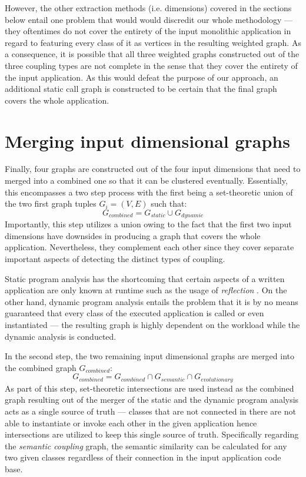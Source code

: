 \documentclass[12pt,a4paper]{report}
\begin{document}
However, the other extraction methods (i.e. dimensions) covered in the
sections below entail one problem that would would discredit
our whole methodology --- they oftentimes do not cover the entirety of the
input monolithic application in regard to featuring every class of it
as vertices in the resulting weighted graph.
As a consequence, it is possible that all three weighted graphs constructed
out of the three coupling types are not complete in the sense that they cover
the entirety of the input application. As this would defeat the purpose of
our approach, an additional static call graph is constructed to be certain
that the final graph covers the whole application.



\section{Merging input dimensional graphs} \label{sect:merging-graphs}

Finally, four graphs are constructed out of the four input dimensions
that need to merged into a combined one so that it can be clustered eventually.
Essentially, this encompasses a two step process with the first being
a set-theoretic union of the two first graph tuples \(G_i = (V, E)\) such that:
\[
  G_{combined} = G_{static} \cup G_{dynamic}
\]
Importantly, this step utilizes a union owing to the fact
that the first two input dimensions have downsides in producing a graph
that covers the whole application.
Nevertheless, they complement each other since they cover separate important
aspects of detecting the distinct types of coupling.

Static program analysis has the shortcoming that certain aspects of a written
application are only known at runtime such as the usage of
\textit{reflection} \cite{landman2017reflection}.
On the other hand, dynamic program analysis entails the problem that
it is by no means guaranteed that every class of the executed application
is called or even instantiated --- the resulting graph is highly dependent
on the workload while the dynamic analysis is conducted.

In the second step, the two remaining input dimensional graphs are merged into
the combined graph \(G_{combined}\):
\[
  G_{combined} = G_{combined} \cap G_{semantic} \cap G_{evolutionary}
\]
As part of this step, set-theoretic intersections are used instead as the
combined graph resulting out of the merger of the static and the dynamic
program analysis acts as a single source of truth --- classes that are not
connected in there are not able to instantiate or invoke each other in the
given application hence intersections are utilized to keep this single source
of truth.
Specifically regarding the \textit{semantic coupling} graph, the semantic
similarity can be calculated for any two given classes regardless of their
connection in the input application code base.
\end{document}
